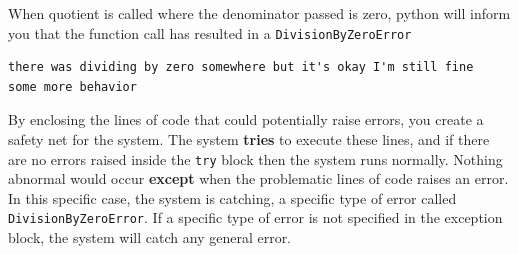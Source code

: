 \begin{Shaded}
\begin{Highlighting}[]
\NormalTok{):}
     \NormalTok{(}\NormalTok{):}
        \OperatorTok{=}
        \OperatorTok{=}

\NormalTok{) }\OperatorTok{{-}\textgreater{}} \NormalTok{: }
    \OperatorTok{==} \NormalTok{:}
    \NormalTok{:}
        \OperatorTok{/}
\end{Highlighting}
\end{Shaded}

When quotient is called where the denominator passed is zero, python
will inform you that the function call has resulted in a
\texttt{DivisionByZeroError}

\begin{Shaded}
\begin{Highlighting}[]
\NormalTok{:}
\NormalTok{,}\NormalTok{)}
\NormalTok{,}\NormalTok{)}
    \NormalTok{(}\NormalTok{)}
    
\NormalTok{(}\NormalTok{)}
\end{Highlighting}
\end{Shaded}

\begin{verbatim}
there was dividing by zero somewhere but it's okay I'm still fine
some more behavior
\end{verbatim}

By enclosing the lines of code that could potentially raise errors, you
create a safety net for the system. The system \textbf{tries} to execute
these lines, and if there are no errors raised inside the \texttt{try}
block then the system runs normally. Nothing abnormal would occur
\textbf{except} when the problematic lines of code raises an error. In
this specific case, the system is catching, a specific type of error
called \texttt{DivisionByZeroError}. If a specific type of error is not
specified in the exception block, the system will catch any general
error.

